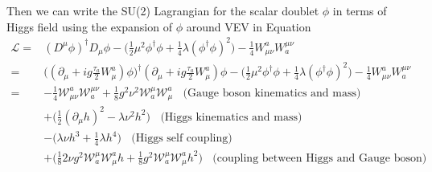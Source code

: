 







\noindent Then we can write the SU(2) Lagrangian for the scalar doublet $\phi$ in terms of Higgs field using the expansion of $\phi$ around VEV in Equation~\label{eqn:physics:qft:u1Higgs}
\begin{equation}
\begin{split}
    \mathcal{L} =& (D^\mu \phi)^\dagger D_\mu \phi - \big(\frac{1}{2} \mu^2 \phi^\dagger\phi + \frac{1}{4} \lambda(\phi^\dagger\phi )^2 \big) - \frac{1}{4} W^a_{\mu\nu}W^{\mu\nu}_a \\
    =& \big( (\partial_\mu +i g \frac{\tau_a}{2} W^a_\mu)  \phi \big)^\dagger (\partial_\mu +i g \frac{\tau_a}{2} W^a_\mu ) \phi - \big(\frac{1}{2} \mu^2 \phi^\dagger\phi + \frac{1}{4} \lambda(\phi^\dagger\phi )^2 \big) - \frac{1}{4} W^a_{\mu\nu}W^{\mu\nu}_a \\
    = & - \frac{1}{4} \mathcal{W}^a_{\mu\nu} \mathcal{W}^{\mu\nu}_a + \frac{1}{8} g^2 \nu^2 \mathcal{W}^{\mu}_a \mathcal{W}_{\mu}^a \;\; \text{ (Gauge boson kinematics and mass) } \\
    & + \big(\frac{1}{2} (\partial_\mu h)^2 -\lambda\nu^2h^2\big)  \;\; \text{ (Higgs kinematics and mass) } \\
    & - \big ( \lambda \nu h^3 + \frac{1}{4}\lambda h^4 \big) \;\; \text{ (Higgs self coupling) } \\
    & + \big( \frac{1}{8} 2\nu g^2 \mathcal{W}^{\mu}_a \mathcal{W}_{\mu}^a h  + \frac{1}{8} g^2  \mathcal{W}^{\mu}_a \mathcal{W}_{\mu}^a h^2 \big)   \;\; \text{ (coupling between Higgs and Gauge boson) }
\end{split}
\end{equation}

